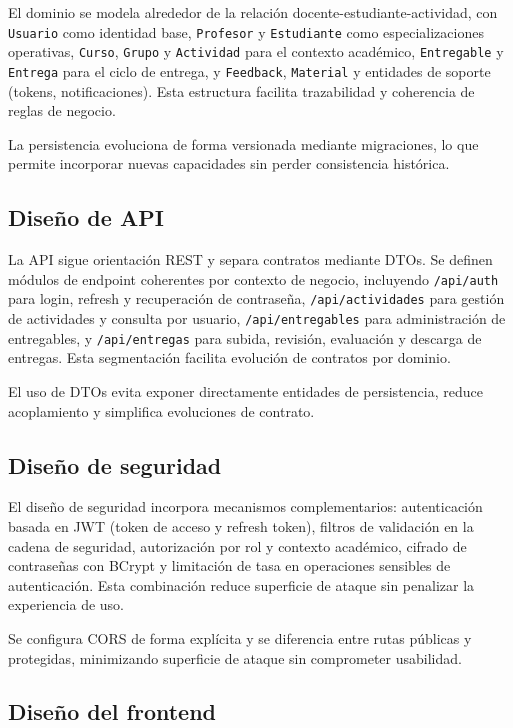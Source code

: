 El dominio se modela alrededor de la relaci\'on docente-estudiante-actividad, con \texttt{Usuario} como identidad base, \texttt{Profesor} y \texttt{Estudiante} como especializaciones operativas, \texttt{Curso}, \texttt{Grupo} y \texttt{Actividad} para el contexto acad\'emico, \texttt{Entregable} y \texttt{Entrega} para el ciclo de entrega, y \texttt{Feedback}, \texttt{Material} y entidades de soporte (tokens, notificaciones). Esta estructura facilita trazabilidad y coherencia de reglas de negocio.

La persistencia evoluciona de forma versionada mediante migraciones,
lo que permite incorporar nuevas capacidades sin perder consistencia hist\'orica.

\subsection{Dise\~no de API}

La API sigue orientaci\'on REST y separa contratos mediante DTOs. Se definen m\'odulos de endpoint coherentes por contexto de negocio, incluyendo \texttt{/api/auth} para login, refresh y recuperaci\'on de contrase\~na, \texttt{/api/actividades} para gesti\'on de actividades y consulta por usuario, \texttt{/api/entregables} para administraci\'on de entregables, y \texttt{/api/entregas} para subida, revisi\'on, evaluaci\'on y descarga de entregas. Esta segmentaci\'on facilita evoluci\'on de contratos por dominio.

El uso de DTOs evita exponer directamente entidades de persistencia,
reduce acoplamiento y simplifica evoluciones de contrato.

\subsection{Dise\~no de seguridad}

El dise\~no de seguridad incorpora mecanismos complementarios: autenticaci\'on basada en JWT (token de acceso y refresh token), filtros de validaci\'on en la cadena de seguridad, autorizaci\'on por rol y contexto acad\'emico, cifrado de contrase\~nas con BCrypt y limitaci\'on de tasa en operaciones sensibles de autenticaci\'on. Esta combinaci\'on reduce superficie de ataque sin penalizar la experiencia de uso.

Se configura CORS de forma expl\'icita y se diferencia entre rutas p\'ublicas y protegidas,
minimizando superficie de ataque sin comprometer usabilidad.

\subsection{Dise\~no del frontend}

